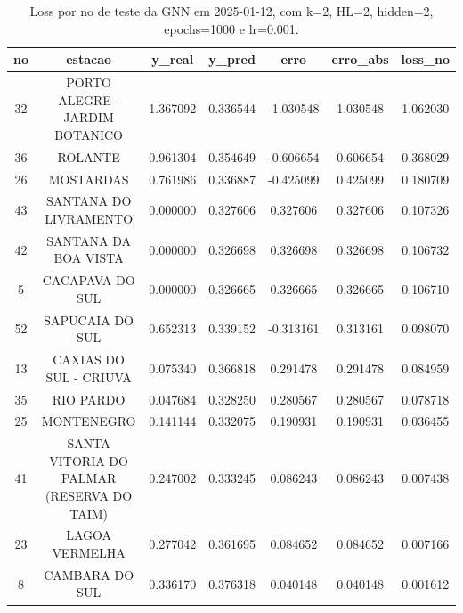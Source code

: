 \begin{table}[h]
\centering
\caption{Loss por no de teste da GNN em 2025-01-12, com k=2, HL=2, hidden=2, epochs=1000 e lr=0.001.}
\label{tab:gnn_loss_k2_hl2_h2_e1000_d20250112}
\begin{tabular}{ccccccc}
\toprule
no & estacao & y\_real & y\_pred & erro & erro\_abs & loss\_no \\
\midrule
32 & PORTO ALEGRE - JARDIM BOTANICO & 1.367092 & 0.336544 & -1.030548 & 1.030548 & 1.062030 \\
36 & ROLANTE & 0.961304 & 0.354649 & -0.606654 & 0.606654 & 0.368029 \\
26 & MOSTARDAS & 0.761986 & 0.336887 & -0.425099 & 0.425099 & 0.180709 \\
43 & SANTANA DO LIVRAMENTO & 0.000000 & 0.327606 & 0.327606 & 0.327606 & 0.107326 \\
42 & SANTANA DA BOA VISTA & 0.000000 & 0.326698 & 0.326698 & 0.326698 & 0.106732 \\
5 & CACAPAVA DO SUL & 0.000000 & 0.326665 & 0.326665 & 0.326665 & 0.106710 \\
52 & SAPUCAIA DO SUL & 0.652313 & 0.339152 & -0.313161 & 0.313161 & 0.098070 \\
13 & CAXIAS DO SUL - CRIUVA & 0.075340 & 0.366818 & 0.291478 & 0.291478 & 0.084959 \\
35 & RIO PARDO & 0.047684 & 0.328250 & 0.280567 & 0.280567 & 0.078718 \\
25 & MONTENEGRO & 0.141144 & 0.332075 & 0.190931 & 0.190931 & 0.036455 \\
41 & SANTA VITORIA DO PALMAR (RESERVA DO TAIM) & 0.247002 & 0.333245 & 0.086243 & 0.086243 & 0.007438 \\
23 & LAGOA VERMELHA & 0.277042 & 0.361695 & 0.084652 & 0.084652 & 0.007166 \\
8 & CAMBARA DO SUL & 0.336170 & 0.376318 & 0.040148 & 0.040148 & 0.001612 \\
\bottomrule
\end{tabular}
\end{table}
